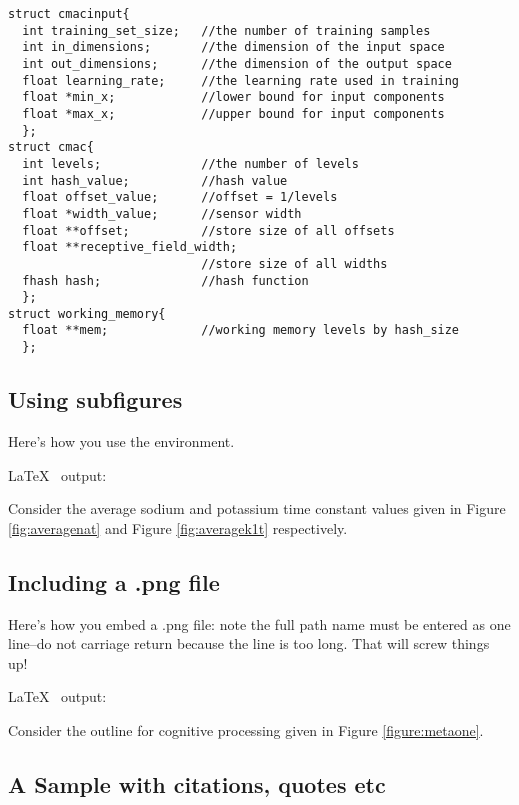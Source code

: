 \documentclass[11pt]{SelfArxOneColBMN}
\begin{document}
\singlespacing
\begin{lstlisting}
struct cmacinput{ 
  int training_set_size;   //the number of training samples 
  int in_dimensions;       //the dimension of the input space 
  int out_dimensions;      //the dimension of the output space 
  float learning_rate;     //the learning rate used in training 
  float *min_x;            //lower bound for input components  
  float *max_x;            //upper bound for input components 
  }; 
struct cmac{ 
  int levels;              //the number of levels  
  int hash_value;          //hash value 
  float offset_value;      //offset = 1/levels 
  float *width_value;      //sensor width 
  float **offset;          //store size of all offsets 
  float **receptive_field_width; 
                           //store size of all widths 
  fhash hash;              //hash function 
  }; 
struct working_memory{      
  float **mem;             //working memory levels by hash_size 
  };  
\end{lstlisting}
\onehalfspacing

\subsection{Using subfigures}

\noindent
Here's how you use the  environment.

\singlespacing
{}
\onehalfspacing
\lstset{fancyvrb=false}

\noindent
\LaTeX~ output:

Consider the average sodium and potassium time constant values given in Figure \ref{fig:averagenat} and
Figure \ref{fig:averagek1t} respectively.

\subsection{Including a .png file}

\noindent
Here's how you embed a .png file: note the full path name must be entered as one line--do not 
carriage return because the line is too long.  That will screw things
up!

\noindent
\LaTeX~ output:

Consider the outline for cognitive processing given in Figure \ref{figure:metaone}.


\subsection{A Sample with citations, quotes etc}
\end{document}
